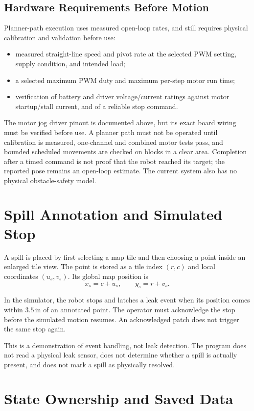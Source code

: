 \documentclass{article}
\begin{document}
\subsection{Hardware Requirements Before Motion}

Planner-path execution uses measured open-loop rates, and still requires physical calibration and validation before use:
\begin{itemize}
    \item measured straight-line speed and pivot rate at the selected PWM setting, supply condition, and intended load;
    \item a selected maximum PWM duty and maximum per-step motor run time;
    \item verification of battery and driver voltage/current ratings against motor startup/stall current, and of a reliable stop command.
\end{itemize}

The motor jog driver pinout is documented above, but its exact board wiring must be verified before use. A planner path must not be operated until calibration is measured, one-channel and combined motor tests pass, and bounded scheduled movements are checked on blocks in a clear area. Completion after a timed command is not proof that the robot reached its target; the reported pose remains an open-loop estimate. The current system also has no physical obstacle-safety model.

\section{Spill Annotation and Simulated Stop}

A spill is placed by first selecting a map tile and then choosing a point inside an enlarged tile view. The point is stored as a tile index $(r,c)$ and local coordinates $(u_s,v_s)$. Its global map position is
\[
x_s=c+u_s,\qquad y_s=r+v_s.
\]

In the simulator, the robot stops and latches a leak event when its position comes within $3.5\,\mathrm{in}$ of an annotated point. The operator must acknowledge the stop before the simulated motion resumes. An acknowledged patch does not trigger the same stop again.

This is a demonstration of event handling, not leak detection. The program does not read a physical leak sensor, does not determine whether a spill is actually present, and does not mark a spill as physically resolved.

\section{State Ownership and Saved Data}
\end{document}
